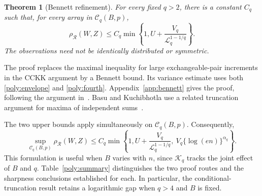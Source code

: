\documentclass[11pt,letterpaper]{article}
\newtheorem{theorem}{Theorem}
\theoremstyle{remark}
\newcommand{\rh}{\rho_{\mathcal R}}
\begin{document}
\begin{theorem}[Bennett refinement]\label{poly:bennett}
For every fixed \(q>2\), there is a constant \(C_q\) such that, for
every array in \(\mathcal C_q(B,p)\),
\begin{equation}
 \rh(W,Z)\le C_q\min\left\{1,
 U+\frac{V_q}{\mathcal{L}_q^{1-1/q}}\right\}.
 \label{poly:bennett-bound}
\end{equation}
The observations need not be identically distributed or symmetric.
\end{theorem}

The proof replaces the maximal inequality for large exchangeable-pair
increments in the CCKK argument by a Bennett bound. Its variance estimate
uses both \eqref{poly:envelope} and \eqref{poly:fourth}.
Appendix~\ref{app:bennett} gives the proof, following the argument
in~\cite{BennettNote}. Basu and Kuchibhotla use a related truncation
argument for maxima of independent sums~\cite[Proposition~4.2]{BK2025}.

The two upper bounds apply simultaneously on \(\mathcal C_q(B,p)\).
Consequently,
\begin{equation}
 \sup_{\mathcal C_q(B,p)}\rh(W,Z)
 \le C_q\min\left\{1,
 U+\frac{V_q}{\mathcal{L}_q^{1-1/q}},\ V_q\{\log(en)\}^{\alpha_q}\right\}.
 \label{poly:combined}
\end{equation}
This formulation is useful when \(B\) varies with \(n\), since \(\mathcal K_q\) tracks the joint
effect of \(B\) and \(q\).
Table~\ref{poly:summary} distinguishes the two proof routes and the
sharpness conclusions established for each. In particular, the
conditional-truncation result retains a logarithmic gap when \(q>4\)
and \(B\) is fixed.
\end{document}
